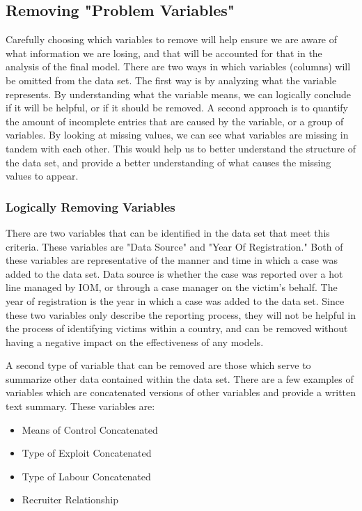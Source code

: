 \documentclass{article} %
\begin{document}
	
	
	\subsection{Removing "Problem Variables"}\label{RemoveVariables}
	
	
	Carefully choosing which variables to remove will help ensure we are aware of what information we are losing, and that will be accounted for that in the analysis of the final model. There are two ways in which variables (columns) will be omitted from the data set. The first way is by analyzing what the variable represents. By understanding what the variable means, we can logically conclude if it will be helpful, or if it should be removed. A second approach is to quantify the amount of incomplete entries that are caused by the variable, or a group of variables. By looking at missing values, we can see what variables are missing in tandem with each other. This would help us to better understand the structure of the data set, and provide a better understanding of what causes the missing values to appear.
	
	\subsubsection{Logically Removing Variables} \label{RemoveVariablesLogically}
	 
	
	There are two variables that can be identified in the data set that meet this criteria. These variables are "Data Source" and "Year Of Registration." Both of these variables are representative of the manner and time in which a case was added to the data set. Data source is whether the case was reported over a hot line managed by IOM, or through a case manager on the victim's behalf. The year of registration is the year in which a case was added to the data set. Since these two variables only describe the reporting process, they will not be helpful in the process of identifying victims within a country, and can be removed without having a negative impact on the effectiveness of any models.
	
	A second type of variable that can be removed are those which serve to summarize other data contained within the data set. There are a few examples of variables which are concatenated versions of other variables and provide a written text summary. These variables are:
	
	\begin{multicols}{2}
		\begin{itemize}
			\item Means of Control Concatenated
			\item Type of Exploit Concatenated
			\item Type of Labour Concatenated
			\item Recruiter Relationship
		\end{itemize}
	\end{multicols}
	
\end{document}
